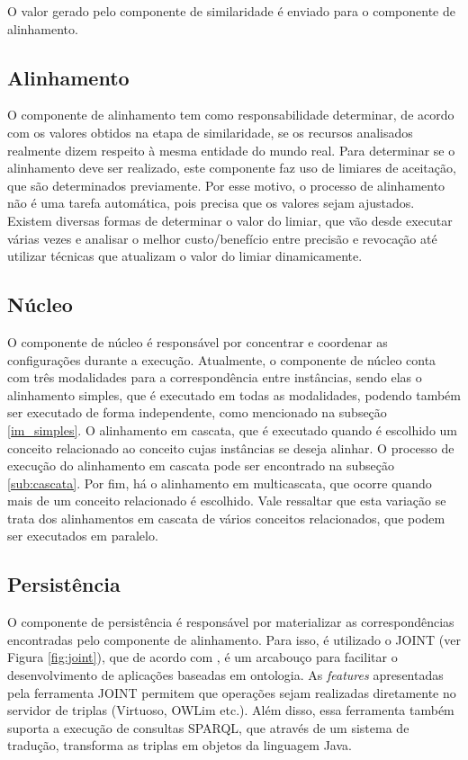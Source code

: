 


O valor gerado pelo componente de similaridade é enviado para o componente de alinhamento.

\subsection{Alinhamento}
O componente de alinhamento tem como responsabilidade determinar, de acordo com os valores obtidos na etapa de similaridade, se os recursos analisados realmente dizem respeito à mesma entidade do mundo real. Para determinar se o alinhamento deve ser realizado, este componente faz uso de limiares de aceitação, que são determinados previamente. Por esse motivo, o processo de alinhamento não é uma tarefa automática, pois precisa que os valores sejam ajustados. Existem diversas formas de determinar o valor do limiar, que vão desde executar várias vezes e analisar o melhor custo/benefício entre precisão e revocação até utilizar técnicas que atualizam o valor do limiar dinamicamente.


\subsection{Núcleo}
O componente de núcleo é responsável por concentrar e coordenar as configurações durante a execução. Atualmente, o componente de núcleo conta com três modalidades para a correspondência entre instâncias, sendo elas o alinhamento simples, que é executado em todas as modalidades, podendo também ser executado de forma independente, como mencionado na subseção \ref{im_simples}. O alinhamento em cascata, que é executado quando é escolhido um conceito relacionado ao conceito cujas instâncias se deseja alinhar. O processo de execução do alinhamento em cascata pode ser encontrado na subseção \ref{sub:cascata}. Por fim, há o alinhamento em multicascata, que ocorre quando mais de um conceito relacionado é escolhido. Vale ressaltar que esta variação se trata dos alinhamentos em cascata de vários conceitos relacionados, que podem ser executados em paralelo.


\subsection{Persistência}
O componente de persistência é responsável por materializar as correspondências encontradas pelo componente de alinhamento. Para isso, é utilizado o JOINT (ver Figura \ref{fig:joint}), que de acordo com , é um arcabouço para facilitar o desenvolvimento de aplicações baseadas em ontologia. As \textit{features} apresentadas pela ferramenta JOINT permitem que operações sejam realizadas diretamente no servidor de triplas (Virtuoso, OWLim etc.). Além disso, essa ferramenta também suporta a execução de consultas SPARQL, que através de um sistema de tradução, transforma as triplas em objetos da linguagem Java.

